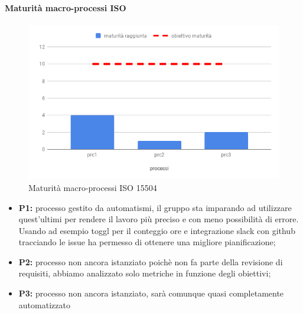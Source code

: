 \paragraph{Maturità macro-processi ISO }
\hspace{15cm}
\begin{figure}[h!]
	\centering
	\includegraphics[scale=0.5]{MaturitaProcessi.png}
	\caption{Maturità macro-processi ISO 15504}
\end{figure}
\begin{itemize}
	\item \textbf{P1:} processo gestito da automatismi, il gruppo sta imparando ad utilizzare quest'ultimi per rendere il lavoro più preciso e con meno possibilità di errore. Usando ad esempio toggl per il conteggio ore e integrazione slack con github tracciando le issue ha
	permesso di ottenere una migliore pianificazione;
	\item \textbf{P2:} processo non ancora istanziato poichè non fa parte della revisione di requisiti, abbiamo analizzato solo metriche in funzione degli obiettivi;
	\item \textbf{P3:} processo non ancora istanziato, sarà comunque quasi completamente automatizzato
\end{itemize}
\clearpage
